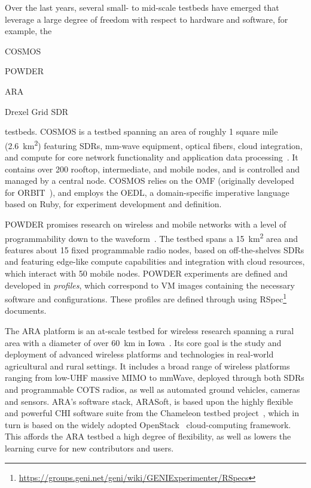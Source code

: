 Over the last years, several small- to mid-scale testbeds have emerged that leverage a large degree of freedom with respect to hardware and software, for example, the
\begin{inlineenum}
    \item \gls{COSMOS}
    \item \gls{POWDER}
    \item \gls{ARA}
    \item Drexel Grid \gls{SDR}
\end{inlineenum} testbeds.
\gls{COSMOS} is a testbed spanning an area of roughly \num{1} square mile (\SI{2.6}{\kilo\meter\squared}) featuring \glspl{SDR}, \si{\milli\meter}-wave equipment, optical fibers, cloud integration, and compute for core network functionality and application data processing~\cite{Cosmos1,cosmos2}.
It contains over \num{200} rooftop, intermediate, and mobile nodes, and is controlled and managed by a central node.
\gls{COSMOS} relies on the \gls{OMF} (originally developed for ORBIT~\cite{orbit}), and employs the \gls{OEDL}, a domain-specific imperative language based on Ruby, for experiment development and definition.

\gls{POWDER} promises research on wireless and mobile networks with a level of programmability down to the waveform~\cite{powder}.
The testbed spans a \SI{15}{\kilo\meter\squared} area and features about \num{15} fixed programmable radio nodes, based on off-the-shelves \glspl{SDR} and featuring edge-like compute capabilities and integration with cloud resources, which interact with \num{50} mobile nodes.
\gls{POWDER} experiments are defined and developed in \emph{profiles}, which correspond to \gls{VM} images containing the necessary software and configurations.
These profiles are defined through using \gls{RSpec}\footnote{\url{https://groups.geni.net/geni/wiki/GENIExperimenter/RSpecs}} documents.

The \gls{ARA} platform is an at-scale testbed for wireless research spanning a rural area with a diameter of over \SI{60}{\kilo\meter} in Iowa~\cite{zhang2022ara}.
Its core goal is the study and deployment of advanced wireless platforms and technologies in real-world agricultural and rural settings.
It includes a broad range of wireless platforms ranging from low-\gls{UHF} massive \gls{MIMO} to \unit{\milli\meter}Wave, deployed through both \glspl{SDR} and programmable \gls{COTS} radios, as well as automated ground vehicles, cameras and sensors.
\gls{ARA}'s software stack, ARASoft, is based upon the highly flexible and powerful \gls{CHI} software suite from the Chameleon testbed project~\cite{keahey2020lessons}, which in turn is based on the widely adopted OpenStack~\cite{openstack} cloud-computing framework.
This affords the \gls{ARA} testbed a high degree of flexibility, as well as lowers the learning curve for new contributors and users.

